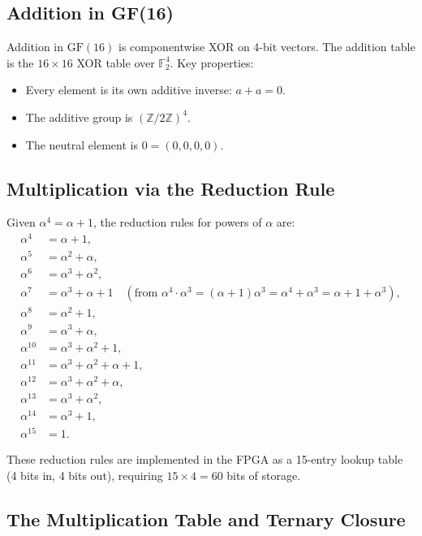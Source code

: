 \subsection{Addition in GF(16)}

Addition in \(\mathrm{GF}(16)\) is componentwise XOR on 4-bit vectors.
The addition table is the \(16\times 16\) XOR table over \(\mathbb{F}_2^4\).
Key properties:
\begin{itemize}
  \item Every element is its own additive inverse: \(a+a=0\).
  \item The additive group is \((\mathbb{Z}/2\mathbb{Z})^4\).
  \item The neutral element is \(0=(0,0,0,0)\).
\end{itemize}

\subsection{Multiplication via the Reduction Rule}

Given \(\alpha^4=\alpha+1\), the reduction rules for powers of \(\alpha\) are:
\begin{align*}
  \alpha^4 &= \alpha+1,\\
  \alpha^5 &= \alpha^2+\alpha,\\
  \alpha^6 &= \alpha^3+\alpha^2,\\
  \alpha^7 &= \alpha^3+\alpha+1 \quad(\text{from }\alpha^4\cdot\alpha^3
              =(\alpha+1)\alpha^3=\alpha^4+\alpha^3=\alpha+1+\alpha^3),\\
  \alpha^8 &= \alpha^2+1,\\
  \alpha^9 &= \alpha^3+\alpha,\\
  \alpha^{10} &= \alpha^3+\alpha^2+1,\\
  \alpha^{11} &= \alpha^3+\alpha^2+\alpha+1,\\
  \alpha^{12} &= \alpha^3+\alpha^2+\alpha,\\
  \alpha^{13} &= \alpha^3+\alpha^2,\\
  \alpha^{14} &= \alpha^3+1,\\
  \alpha^{15} &= 1.
\end{align*}

These reduction rules are implemented in the FPGA as a 15-entry lookup table
(4 bits in, 4 bits out), requiring \(15\times 4=60\) bits of storage.

\subsection{The Multiplication Table and Ternary Closure}

